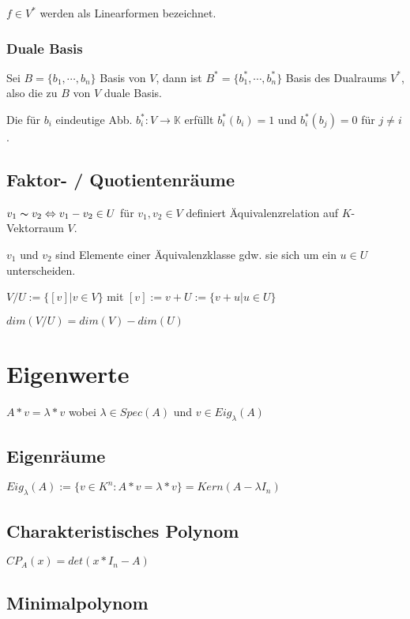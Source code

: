 $f \in V^*$ werden als Linearformen bezeichnet.

\subsubsection*{Duale Basis}

Sei $B = \{b_1, \cdots, b_n\}$ Basis von $V$, dann ist $B^* = \{b_1^*, \cdots, b_n^*\}$ Basis des Dualraums $V^*$, also die zu $B$ von $V$ duale Basis.

Die für $b_i$ eindeutige Abb. $b_i^* : V \rightarrow \mathbb{K}$ erfüllt $b_i^*(b_i) = 1$ und $b_i^*(b_j) = 0$ für $j\neq i$.

\subsection*{Faktor- / Quotientenräume}

$v_1 \thicksim v_2 \Leftrightarrow v_1 - v_2 \in U$ für $v_1, v_2 \in V$ definiert Äquivalenzrelation auf $K$-Vektorraum $V$.

$v_1$ und $v_2$ sind Elemente einer Äquivalenzklasse gdw. sie sich um ein $u \in U$ unterscheiden.

$V/U := \{[v] | v \in V\}$ mit $[v] := v+U := \{v+u|u \in U\}$

$dim(V/U) = dim(V) - dim(U)$

\section*{Eigenwerte}

$A*v = \lambda * v$ wobei $\lambda \in Spec(A)$ und $v \in Eig_\lambda(A)$

\subsection*{Eigenräume}

$Eig_\lambda(A) := \{v \in K^n : A*v = \lambda * v\} = Kern(A-\lambda I_n)$

\subsection*{Charakteristisches Polynom}

$CP_A(x) = det(x*I_n - A)$

\subsection*{Minimalpolynom}

